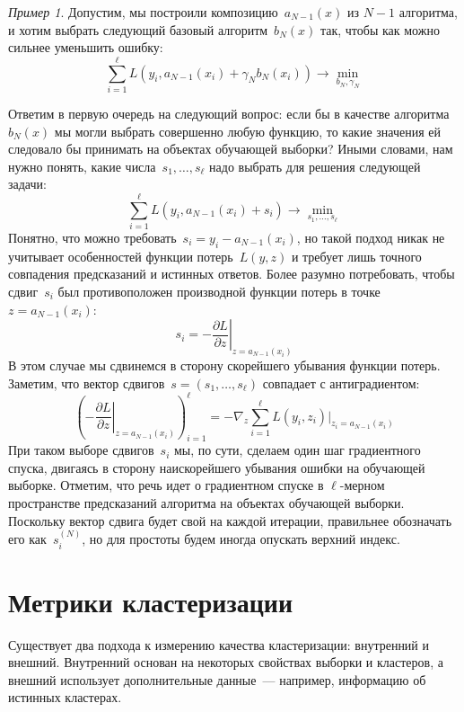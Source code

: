 \documentclass[a4paper, 12pt]{article}
\theoremstyle{plain} %
\theoremstyle{definition} %
\theoremstyle{remark} %
\newtheorem{example}{Пример}
\begin{document}
\begin{example}
Допустим, мы построили композицию~$a_{N - 1}(x)$ из $N - 1$ алгоритма,
и хотим выбрать следующий базовый алгоритм~$b_N(x)$ так, чтобы как можно сильнее
уменьшить ошибку:
\[
    \sum_{i = 1}^{\ell}
        L(y_i, a_{N - 1}(x_i) + \gamma_N b_N(x_i))
    \to
    \min_{b_N, \gamma_N}
\]

Ответим в первую очередь на следующий вопрос: если бы в качестве алгоритма~$b_N(x)$ мы
могли выбрать совершенно любую функцию, то какие значения ей следовало бы принимать
на объектах обучающей выборки? Иными словами, нам нужно понять, какие числа~$s_1, \dots, s_\ell$
надо выбрать для решения следующей задачи:
\[
    \sum_{i = 1}^{\ell}
        L(y_i, a_{N - 1}(x_i) + s_i)
    \to
    \min_{s_1, \dots, s_\ell}
\]
Понятно, что можно требовать~$s_i = y_i - a_{N - 1}(x_i)$,
но такой подход никак не учитывает особенностей функции потерь~$L(y, z)$
и требует лишь точного совпадения предсказаний и истинных ответов.
Более разумно потребовать, чтобы сдвиг~$s_i$ был противоположен производной функции потерь
в точке~$z = a_{N - 1}(x_i)$:
\[
    s_i
    =
    -
    \left.
    \frac{\partial L}{\partial z}
    \right|_{z = a_{N - 1}(x_i)}
\]
В этом случае мы сдвинемся в сторону скорейшего убывания функции потерь.
Заметим, что вектор сдвигов~$s = (s_1, \dots, s_\ell)$ совпадает
с антиградиентом:
\[
    \left(
        -\left.
        \frac{\partial L}{\partial z}
        \right|_{z = a_{N - 1}(x_i)}
    \right)_{i = 1}^{\ell}
    =
    -\nabla_z
    \sum_{i = 1}^{\ell}
        L(y_i, z_i)
    \big|_{z_i = a_{N - 1}(x_i)}
\]
При таком выборе сдвигов~$s_i$ мы, по сути, сделаем один шаг градиентного спуска,
двигаясь в сторону наискорейшего убывания ошибки на обучающей выборке.
Отметим, что речь идет о градиентном спуске в $\ell$-мерном пространстве предсказаний алгоритма
на объектах обучающей выборки.
Поскольку вектор сдвига будет свой на каждой итерации, правильнее обозначать его как~$s_i^{(N)}$,
но для простоты будем иногда опускать верхний индекс.

\section{Метрики кластеризации}

Существует два подхода к измерению качества кластеризации: внутренний и внешний.
Внутренний основан на некоторых свойствах выборки и кластеров,
а внешний использует дополнительные данные~--- например, информацию об истинных кластерах.


\end{example}
\end{document}
